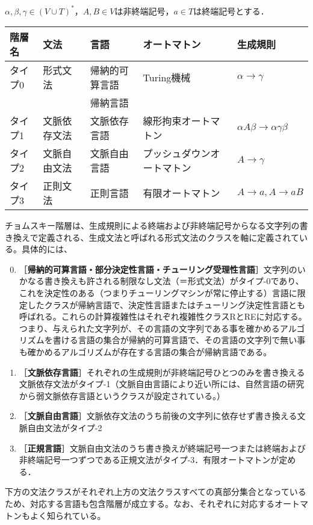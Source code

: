 \documentclass[uplatex, dvipdfmx]{jsreport}
\begin{document}
$\alpha,\beta,\gamma\in(V\cup T)^*$，$A,B\in V$は非終端記号，$a\in T$は終端記号とする．
\begin{center}\begin{tabular}{lllll}\hline
    階層名&文法&言語&オートマトン&生成規則\\\hline
    タイプ0&形式文法&帰納的可算言語&Turing機械&$\alpha\to\gamma$\\
    &&帰納言語\\
    タイプ1&文脈依存文法&文脈依存言語&線形拘束オートマトン&$\alpha A\beta\to\alpha\gamma\beta$\\
    タイプ2&文脈自由文法&文脈自由言語&プッシュダウンオートマトン&$A\to\gamma$\\
    タイプ3&正則文法&正則言語&有限オートマトン&$A\to a,A\to aB$\\\hline
\end{tabular}\end{center}

\begin{remark}[文法の分類]
    チョムスキー階層は、生成規則による終端および非終端記号からなる文字列の書き換えで定義される、生成文法と呼ばれる形式文法のクラスを軸に定義されている。具体的には、
    \begin{enumerate}\setcounter{enumi}{-1}
        \item ［\textbf{帰納的可算言語・部分決定性言語・チューリング受理性言語}］文字列のいかなる書き換えも許される制限なし文法（＝形式文法）がタイプ-0であり、これを決定性のある（つまりチューリングマシンが常に停止する）言語に限定したクラスが帰納言語で、決定性言語またはチューリング決定性言語とも呼ばれる。これらの計算複雑性はそれぞれ複雑性クラスRとREに対応する。つまり、与えられた文字列が、その言語の文字列である事を確かめるアルゴリズムを書ける言語の集合が帰納的可算言語で、その言語の文字列で無い事も確かめるアルゴリズムが存在する言語の集合が帰納言語である。
        \item ［\textbf{文脈依存言語}］それぞれの生成規則が非終端記号ひとつのみを書き換える文脈依存文法がタイプ-1（文脈自由言語により近い所には、自然言語の研究から弱文脈依存言語というクラスが設定されている。）
        \item ［\textbf{文脈自由言語}］文脈依存文法のうち前後の文字列に依存せず書き換える文脈自由文法がタイプ-2
        \item ［\textbf{正規言語}］文脈自由文法のうち書き換えが終端記号一つまたは終端および非終端記号一つずつである正規文法がタイプ-3．有限オートマトンが定める．
    \end{enumerate}
    下方の文法クラスがそれぞれ上方の文法クラスすべての真部分集合となっているため、対応する言語も包含階層が成立する。なお、それぞれに対応するオートマトンもよく知られている。
\end{remark}
\end{document}
